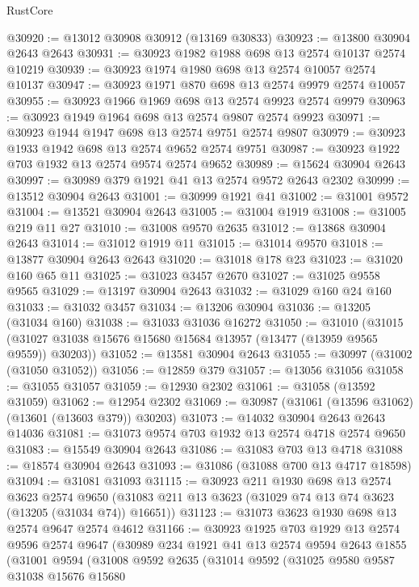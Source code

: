 \begin{lexlean}{RustCore}
\begin{coremodule}
@30920 := @13012 @30908 @30912 (@13169 @30833)
@30923 := @13800 @30904 @2643 @2643
@30931 := @30923 @1982 @1988 @698 @13 @2574 @10137 @2574 @10219
@30939 := @30923 @1974 @1980 @698 @13 @2574 @10057 @2574 @10137
@30947 := @30923 @1971 @870 @698 @13 @2574 @9979 @2574 @10057
@30955 := @30923 @1966 @1969 @698 @13 @2574 @9923 @2574 @9979
@30963 := @30923 @1949 @1964 @698 @13 @2574 @9807 @2574 @9923
@30971 := @30923 @1944 @1947 @698 @13 @2574 @9751 @2574 @9807
@30979 := @30923 @1933 @1942 @698 @13 @2574 @9652 @2574 @9751
@30987 := @30923 @1922 @703 @1932 @13 @2574 @9574 @2574 @9652
@30989 := @15624 @30904 @2643
@30997 := @30989 @379 @1921 @41 @13 @2574 @9572 @2643 @2302
@30999 := @13512 @30904 @2643
@31001 := @30999 @1921 @41
@31002 := @31001 @9572
@31004 := @13521 @30904 @2643
@31005 := @31004 @1919
@31008 := @31005 @219 @11 @27
@31010 := @31008 @9570 @2635
@31012 := @13868 @30904 @2643
@31014 := @31012 @1919 @11
@31015 := @31014 @9570
@31018 := @13877 @30904 @2643 @2643
@31020 := @31018 @178 @23
@31023 := @31020 @160 @65 @11
@31025 := @31023 @3457 @2670
@31027 := @31025 @9558 @9565
@31029 := @13197 @30904 @2643
@31032 := @31029 @160 @24 @160
@31033 := @31032 @3457
@31034 := @13206 @30904
@31036 := @13205 (@31034 @160)
@31038 := @31033 @31036 @16272
@31050 := @31010
    (@31015 (@31027 @31038 @15676 @15680 @15684 @13957 (@13477 (@13959 @9565 @9559)) @30203))
@31052 := @13581 @30904 @2643
@31055 := @30997 (@31002 (@31050 @31052))
@31056 := @12859 @379
@31057 := @13056 @31056
@31058 := @31055 @31057
@31059 := @12930 @2302
@31061 := @31058 (@13592 @31059)
@31062 := @12954 @2302
@31069 := @30987 (@31061 (@13596 @31062) (@13601 (@13603 @379)) @30203)
@31073 := @14032 @30904 @2643 @2643 @14036
@31081 := @31073 @9574 @703 @1932 @13 @2574 @4718 @2574 @9650
@31083 := @15549 @30904 @2643
@31086 := @31083 @703 @13 @4718
@31088 := @18574 @30904 @2643
@31093 := @31086 (@31088 @700 @13 @4717 @18598)
@31094 := @31081 @31093
@31115 := @30923
    @211
    @1930
    @698
    @13
    @2574
    @3623
    @2574
    @9650
    (@31083 @211 @13 @3623 (@31029 @74 @13 @74 @3623 (@13205 (@31034 @74)) @16651))
@31123 := @31073 @3623 @1930 @698 @13 @2574 @9647 @2574 @4612
@31166 := @30923
    @1925
    @703
    @1929
    @13
    @2574
    @9596
    @2574
    @9647
    (@30989
      @234
      @1921
      @41
      @13
      @2574
      @9594
      @2643
      @1855
      (@31001
        @9594
        (@31008
          @9592
          @2635
          (@31014
            @9592
            (@31025
              @9580
              @9587
              @31038
              @15676
              @15680

\end{coremodule}
\end{lexlean}
